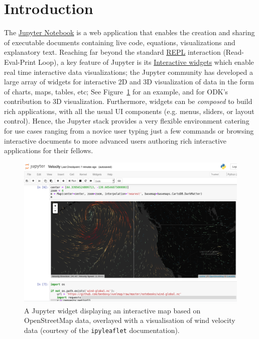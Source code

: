 \documentclass{deliverablereport}
\author{Odile Bénassy and Nicolas M. Thiéry}
\begin{document}
\maketitle
\githubissuedescription

\section{Introduction}


The \href{https://jupyter.org}{Jupyter Notebook} is a web application
that enables the creation and sharing of executable documents
containing live code, equations, visualizations and explanatory text.
Reaching far beyond the standard
\href{https://en.wikipedia.org/wiki/Read-eval-print_loop}{REPL}
interaction (Read-Eval-Print Loop), a key feature of Jupyter is its
\href{http://jupyter.org/widgets}{Interactive widgets} which enable
real time interactive data visualizations; the Jupyter community has
developed a large array of widgets for interactive 2D and 3D
visualization of data in the form of charts, maps, tables, etc;
See Figure~\ref{fig:ipyleaflet} for an example, and
 for ODK's contribution to 3D visualization.
Furthermore, widgets can be \emph{composed} to build rich
applications, with all the usual UI components (e.g. menus, sliders,
or layout control).
%
Hence, the Jupyter stack provides a very flexible environment catering
for use cases ranging from a novice user typing just a few commands
or browsing interactive documents to more advanced users authoring
rich interactive applications for their fellows.

\begin{figure}[h]
  \begin{center}
    \includegraphics[width=\textwidth]{images/Velocity}
  \caption{A Jupyter widget displaying an interactive map based on
  OpenStreetMap data, overlayed with a visualisation of wind velocity
  data \tiny{(courtesy of the \lstinline{ipyleaflet} documentation)}.}
  \label{fig:ipyleaflet}
  \end{center}
\end{figure}
\end{document}
